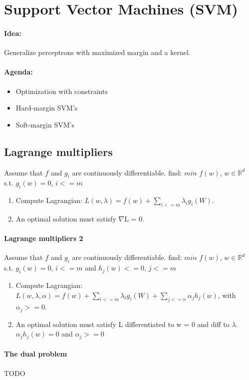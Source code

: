 \section{Support Vector Machines (SVM)}
\paragraph{Idea: }Generalize perceptrons with maximized margin and  a kernel.

\paragraph{Agenda:}
\begin{itemize}
    \item Optimization with constraints
    \item Hard-margin SVM's
    \item Soft-margin SVM's
\end{itemize}{}

\subsection{Lagrange multipliers}
Assume that $f$ and $g_i$ are continuously differentiable.
find: $min$ $f(w)$, $w\in\mathbb{R}^d$ s.t. $g_i(w) = 0$, $i<=m$
\begin{enumerate}
    \item Compute Lagrangian: $L(w,\lambda) = f(w) + \sum_{i<=m}\lambda_ig_i(W)$.
    \item An optimal solution must satisfy $\nabla$L = 0.
\end{enumerate}{}

\paragraph{Lagrange multipliers 2}
Assume that $f$ and $g_i$ are continuously differentiable.
find: $min$ $f(w)$, $w\in\mathbb{R}^d$ s.t. $g_i(w) = 0$, $i <= m$ and $h_j(w) <= 0$, $j <= m$
\begin{enumerate}
    \item Compute Lagrangian: $L(w,\lambda,\alpha) = f(w) + \sum_{i<=m}\lambda_ig_i(W) + \sum_{j<=n}\alpha_jh_j(w)$, with $\alpha_j >=0$.
    \item An optimal solution must satisfy L differentiated to w = 0 and diff to $\lambda$. $\alpha_jh_j(w) = 0$ and $\alpha_j >=0 $
\end{enumerate}{}

\paragraph{The dual problem}
TODO

